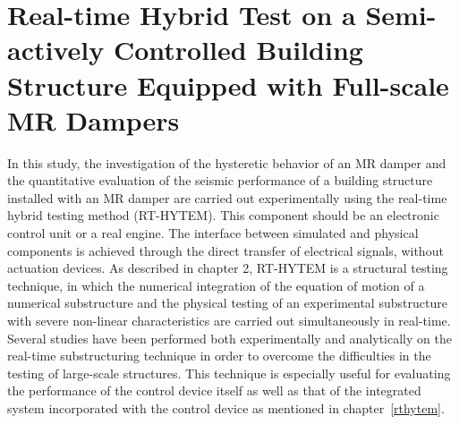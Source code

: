 \chapter{Real-time Hybrid Test on a Semi-actively Controlled Building Structure Equipped with Full-scale MR Dampers}
\label{chap:rthytem-mrdamper}

In this study, the investigation of the hysteretic behavior of an MR damper and the quantitative evaluation of the seismic performance of a building structure installed with an MR damper are carried out experimentally using the real-time hybrid testing method (RT-HYTEM). This component should be an electronic control unit or a real engine. The interface between simulated and physical components is achieved through the direct transfer of electrical signals, without actuation devices\citep{christenson2008large}. As described in chapter 2, RT-HYTEM is a structural testing technique, in which the numerical integration of the equation of motion of a numerical substructure and the physical testing of an experimental substructure with severe non-linear characteristics are carried out simultaneously in real-time. Several studies have been performed both experimentally and analytically on the real-time substructuring technique in order to overcome the difficulties in the testing of large-scale structures. This technique is especially useful for evaluating the performance of the control
device itself as well as that of the integrated system incorporated with the control device as mentioned in chapter~\ref{rthytem}.

